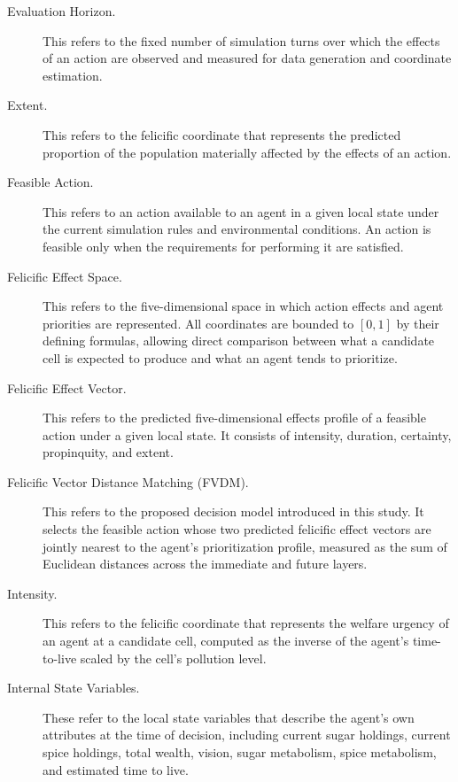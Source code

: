 \documentclass{icsthesis}
\begin{document}
\begin{mainmatter}
\begin{description}
\item[Evaluation Horizon.] This refers to the fixed number of simulation turns over which the effects of an action are observed and measured for data generation and coordinate estimation.

\item[Extent.] This refers to the felicific coordinate that represents the predicted proportion of the population materially affected by the effects of an action.

\item[Feasible Action.] This refers to an action available to an agent in a given local state under the current simulation rules and environmental conditions. An action is feasible only when the requirements for performing it are satisfied.

\item[Felicific Effect Space.] This refers to the five-dimensional space in which action effects and agent priorities are represented. All coordinates are bounded to $[0,1]$ by their defining formulas, allowing direct comparison between what a candidate cell is expected to produce and what an agent tends to prioritize.

\item[Felicific Effect Vector.] This refers to the predicted five-dimensional effects profile of a feasible action under a given local state. It consists of intensity, duration, certainty, propinquity, and extent.

\item[Felicific Vector Distance Matching (FVDM).] This refers to the proposed decision model introduced in this study. It selects the feasible action whose two predicted felicific effect vectors are jointly nearest to the agent's prioritization profile, measured as the sum of Euclidean distances across the immediate and future layers.

\item[Intensity.] This refers to the felicific coordinate that represents the welfare urgency of an agent at a candidate cell, computed as the inverse of the agent's time-to-live scaled by the cell's pollution level.

\item[Internal State Variables.] These refer to the local state variables that describe the agent's own attributes at the time of decision, including current sugar holdings, current spice holdings, total wealth, vision, sugar metabolism, spice metabolism, and estimated time to live.


\end{description}
\end{mainmatter}
\end{document}
